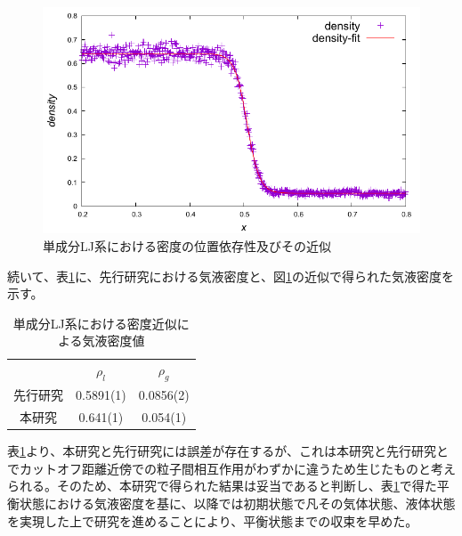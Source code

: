 \documentclass[titlepage]{jsreport}
\begin{document}
\begin{figure}[htbp]
    \begin{center}
        \includegraphics[width=14cm]{fig/ln78732-rn10976-ld0.629856-rd0.087808/ln78732-rn10976-ld0.629856-rd0.087808-fitting.pdf}
    \end{center}
    \caption{単成分LJ系における密度の位置依存性及びその近似}
    \label{fig:ln78732-rn10976-ld0.629856-rd0.087808-fitting}
\end{figure}

\newpage
続いて、表\ref{table:ln78732-rn10976-ld0.629856-rd0.087808-fitting}に、先行研究\cite{gas-liquid-equilibrium}における気液密度と、図\ref{fig:ln78732-rn10976-ld0.629856-rd0.087808-fitting}の近似で得られた気液密度を示す。

\begin{table}[htbp]
    \begin{center}
        \caption{単成分LJ系における密度近似による気液密度値}
        \label{table:ln78732-rn10976-ld0.629856-rd0.087808-fitting}
            \begin{tabular}{c || c | c}
                & $\rho_l$ & $\rho_g$ \\
                先行研究 & 0.5891(1) & 0.0856(2) \\
                本研究 & 0.641(1) & 0.054(1)
            \end{tabular}
    \end{center}
\end{table}

表\ref{table:ln78732-rn10976-ld0.629856-rd0.087808-fitting}より、本研究と先行研究には誤差が存在するが、これは本研究と先行研究とでカットオフ距離近傍での粒子間相互作用がわずかに違うため生じたものと考えられる。そのため、本研究で得られた結果は妥当であると判断し、表\ref{table:ln78732-rn10976-ld0.629856-rd0.087808-fitting}で得た平衡状態における気液密度を基に、以降では初期状態で凡その気体状態、液体状態を実現した上で研究を進めることにより、平衡状態までの収束を早めた。
\end{document}
